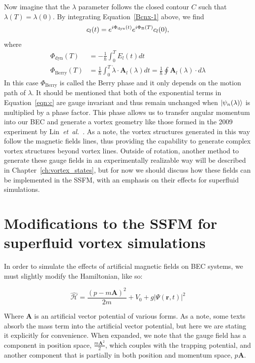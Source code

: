 Now imagine that the $\lambda$ parameter follows the closed contour $C$ such that $\lambda(T) = \lambda(0)$. 
By integrating Equation~\eqref{Bcnx-1} above, we find
\begin{equation}
c_l(t) = e^{i \Phi_{\text{dyn}}(t)}e^{i\Phi_{\text B}(T)}c_l(0),
\label{eqn:c}
\end{equation}
where
\begin{equation}
\begin{split}
\Phi_{\text{dyn}}(T) &= - \frac{1}{\hbar}\int_0^TE_l(t)dt \\
\Phi_{\text{Berry}} (T)&= \frac{1}{\hbar} \int_0 ^T \dot{\lambda} \cdot \mathbf{A}_l(\lambda)dt = \frac{1}{\hbar}\oint\mathbf{A}_l(\lambda) \cdot d\lambda
\end{split}
\end{equation}
In this case $\Phi_{\text{Berry}}$ is called the Berry phase and it only depends on the motion path of $\lambda$. 
It should be mentioned that both of the exponential terms in Equation~\eqref{eqn:c} are gauge invariant and thus remain unchanged when $\ket{\psi_n(\lambda)}$ is multiplied by a phase factor.
This phase allows us to transfer angular momentum into our BEC and generate a vortex geometry like those formed in the 2009 experiment by Lin~\textit{et~al.}~\cite{Lin2009}.
As a note, the vortex structures generated in this way follow the magnetic fields lines, thus providing the capability to generate complex vortex structures beyond vortex lines.
Outside of rotation, another method to generate these gauge fields in an experimentally realizable way will be described in Chapter~\ref{ch:vortex_states}, but for now we should discuss how these fields can be implemented in the SSFM, with an emphasis on their effects for superfluid simulations.

\section{Modifications to the SSFM for superfluid vortex simulations}
\label{sec:implementation}

In order to simulate the effects of artificial magnetic fields on BEC systems, we must slightly modify the Hamiltonian, like so:

\begin{equation}
\mathcal{\hat H} = \frac{(p-m\mathbf{A})^2}{2m} + V_0 + g|\Psi(\mathbf{r},t)|^2
\end{equation}

Where $\mathbf{A}$ is an artificial vector potential of various forms.
As a note, some texts absorb the mass term into the artificial vector potential, but here we are stating it explicitly for convenience.
When expanded, we note that the gauge field has a component in position space, $\frac{m\mathbf{A}^2}{2}$, which couples with the trapping potential, and another component that is partially in both position and momentum space, $p\mathbf{A}$.

